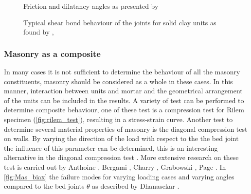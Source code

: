 \begin{figure}[!htb]
    \centering
     \hspace{3em}
    \caption{Friction and dilatancy angles as presented by \citet{lourenco1996}}
    \label{fig:Coulomb}
\end{figure}
\begin{figure}[!htb]
    \centering
     \hspace{3em}
    \caption{Typical shear bond behaviour of the joints for solid clay units as found by \citet{pluijm1993}, \cite{lourenco1996}}
    \label{fig:Shear_bond}
\end{figure}


\subsubsection{Masonry as a composite}
In many cases it is not sufficient to determine the behaviour of all the masonry constituents, masonry should be considered as a whole in these cases. In this manner, interaction between units and mortar and the geometrical arrangement of the units can be included in the results. A variety of test can be performed to determine composite behaviour, one of these test is a compression test for Rilem specimen (\autoref{fig:rilem_test}), resulting in a stress-strain curve. Another test to determine several material properties of masonry is the diagonal compression test on walls. By varying the direction of the load with respect to the the bed joint the influence of this parameter can be determined, this is an interesting alternative in the diagonal compression test \cite{barraza2012numerical}. More extensive research on these test is carried out by Anthoine \cite{anthoine1992}, Bergami \cite{bergami2007}, Charry \cite{charry2010}, Grabowski \cite{grabowski2005}, Page \cite{page1981}. In \autoref{fig:Mas_biax} the failure modes for varying loading cases and varying angles compared to the bed joints $\theta$ as described by Dhanasekar \cite{Dhanasekar1985}.

